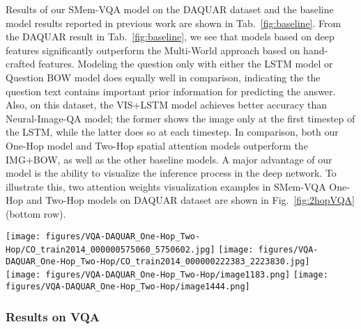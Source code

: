 Results of our SMem-VQA model on the DAQUAR dataset and the baseline model results reported in previous work are shown in Tab.~\ref{fig:baseline}. 
From the DAQUAR result in Tab.~\ref{fig:baseline}, we see that models based on deep features significantly outperform the Multi-World approach based on hand-crafted features. Modeling the question only with either the LSTM model or Question BOW model does equally well in comparison, indicating the the question text contains important prior information for predicting the answer. Also, on this dataset, the VIS+LSTM model achieves better accuracy than Neural-Image-QA model; the former shows the image only at the first timestep of the LSTM, while the latter does so at each timestep. In comparison, both our One-Hop model and Two-Hop spatial attention models outperform the IMG+BOW, as well as the other baseline models.
A major advantage of our model is the ability to visualize the inference process in the deep network. To illustrate this, two attention weights visualization examples in SMem-VQA One-Hop and Two-Hop models on DAQUAR dataset are shown in Fig.~\ref{fig:2hopVQA} (bottom row).



\begin{figure*}[t]
\texttt{[image: figures/VQA-DAQUAR\_One-Hop\_Two-Hop/CO\_train2014\_000000575060\_5750602.jpg]}
  \texttt{[image: figures/VQA-DAQUAR\_One-Hop\_Two-Hop/CO\_train2014\_000000222383\_2223830.jpg]}\\
  \texttt{[image: figures/VQA-DAQUAR\_One-Hop\_Two-Hop/image1183.png]}
  \texttt{[image: figures/VQA-DAQUAR\_One-Hop\_Two-Hop/image1444.png]}
\vspace{-0.25in}
\caption{Visualization of the spatial attention weights in the SMem-VQA One-Hop and Two-Hop models on VQA (top row) and DAQUAR (bottom row) datasets. For each image and question pair, we show the original image, the attention weights $W_{att}$ of the One-Hop model, and the two attention weights $W_{att}$ and $W_{att2}$ of the Two-Hop model in order.}\label{fig:2hopVQA}
\vspace{-0.15in}
\end{figure*}
\subsubsection{Results on VQA}


